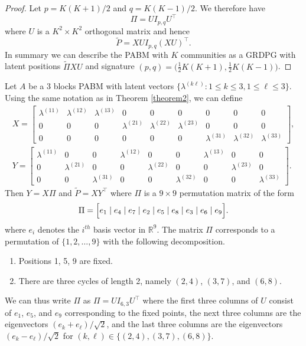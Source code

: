 \documentclass[12pt]{article}
\begin{document}
\begin{proof}
Let $p = K (K + 1) / 2$ and $q = K (K - 1) / 2$. 
We therefore have
\begin{equation} \label{eq:permutation}
\Pi = U I_{p,q} U^\top
\end{equation}
where $U$ is a $K^2 \times K^2$ orthogonal matrix and hence
\begin{equation} \label{eq:pabm-grdpg}
\tilde{P} = X U I_{p, q} (X U)^\top.
\end{equation}
In summary we can describe the PABM with $K$ communities as a GRDPG with latent
positions $\tilde{\Pi} X U$ and signature $(p,q) = \bigl( \tfrac{1}{2} K (K + 1) ,
\tfrac{1}{2} K (K - 1)\bigr)$.
\end{proof}

\begin{example} Let $A$ be a $3$ blocks PABM with latent vectors
  $\{\lambda^{(k \ell)} \colon 1 \leq k \leq 3, 1 \leq \ell \leq 3\}$. Using the same notation as in Theorem
  \ref{theorem2}, we can define
\begin{gather*}
X = \begin{bmatrix}
\lambda^{(11)} & \lambda^{(12)} & \lambda^{(13)} & 0 & 0 & 0 & 0 & 0 & 0 \\
0 & 0 & 0 & \lambda^{(21)} & \lambda^{(22)} & \lambda^{(23)} & 0 & 0 & 0 \\
0 & 0 & 0 & 0 & 0 & 0 & \lambda^{(31)} & \lambda^{(32)} & \lambda^{(33)}
\end{bmatrix}, \\
Y = \begin{bmatrix}
\lambda^{(11)} & 0 & 0 & \lambda^{(12)} & 0 & 0 & \lambda^{(13)} & 0 & 0 \\
0 & \lambda^{(21)} & 0 & 0 & \lambda^{(22)} & 0 & 0 & \lambda^{(23)} & 0 \\
0 & 0 & \lambda^{(31)} & 0 & 0 & \lambda^{(32)} & 0 & 0 & \lambda^{(33)}
\end{bmatrix}.
\end{gather*}
Then $Y = X \Pi$ and $\tilde{P} = X Y^{\top}$ where $\Pi$ is a $9 \times 9$ 
permutation matrix of the form
$$\Pi = 
\Bigl[e_1 \mid e_4 \mid e_7 \mid e_2 \mid e_5 \mid e_8 \mid e_3
\mid e_6 \mid e_9 \Bigr].$$
where $e_i$ denotes the $i^{th}$ basis vector in $\mathbb{R}^{9}$. 
The matrix $\Pi$ corresponds to a permutation of $\{1,2,\dots,9\}$
with the following decomposition.
\begin{enumerate}
\item Positions 1, 5, 9 are fixed.
\item There are three cycles of length 2, namely $(2, 4)$, $(3, 7)$, and $(6, 8)$.
\end{enumerate}
We can thus write $\Pi$ as $\Pi = U I_{6, 3} U^\top$ where the first three
columns of $U$ consist of $e_1$, $e_5$, and $e_9$ corresponding to the
fixed points, the next three columns are the eigenvectors
$(e_k + e_{\ell}) / \sqrt{2}$, and the last three columns are the eigenvectors
$(e_k - e_{\ell}) / \sqrt{2}$ for $(k, \ell) \in
\{(2,4),(3,7),(6,8)\}$.


\end{example}
\end{document}
